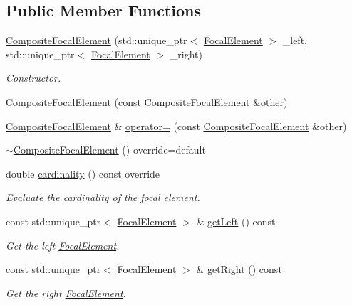 \subsection*{Public Member Functions}
\begin{DoxyCompactItemize}
\item 
\hyperlink{classCompositeFocalElement_a5edb45a7eb4e963f8a3fe9f5e86dbcc2}{Composite\+Focal\+Element} (std\+::unique\+\_\+ptr$<$ \hyperlink{classFocalElement}{Focal\+Element} $>$ \+\_\+left, std\+::unique\+\_\+ptr$<$ \hyperlink{classFocalElement}{Focal\+Element} $>$ \+\_\+right)
\begin{DoxyCompactList}\small\item\em Constructor. \end{DoxyCompactList}\item 
\hyperlink{classCompositeFocalElement_ad7bf43cd99f64e40b1db1d02dbb69713}{Composite\+Focal\+Element} (const \hyperlink{classCompositeFocalElement}{Composite\+Focal\+Element} \&other)
\item 
\hyperlink{classCompositeFocalElement}{Composite\+Focal\+Element} \& \hyperlink{classCompositeFocalElement_a08412d0e70bab10c523baa83b6eb1937}{operator=} (const \hyperlink{classCompositeFocalElement}{Composite\+Focal\+Element} \&other)
\item 
\hyperlink{classCompositeFocalElement_a29f321b81347d8d687aca284e0507aec}{$\sim$\+Composite\+Focal\+Element} () override=default
\item 
double \hyperlink{classCompositeFocalElement_a18a671ee1759b5df42770384ace275fd}{cardinality} () const override
\begin{DoxyCompactList}\small\item\em Evaluate the cardinality of the focal element. \end{DoxyCompactList}\item 
const std\+::unique\+\_\+ptr$<$ \hyperlink{classFocalElement}{Focal\+Element} $>$ \& \hyperlink{classCompositeFocalElement_af4e6a58bc9db40cde3446b76d91f5e57}{get\+Left} () const 
\begin{DoxyCompactList}\small\item\em Get the left \hyperlink{classFocalElement}{Focal\+Element}. \end{DoxyCompactList}\item 
const std\+::unique\+\_\+ptr$<$ \hyperlink{classFocalElement}{Focal\+Element} $>$ \& \hyperlink{classCompositeFocalElement_aef97b94d2375742722833674a3f38a54}{get\+Right} () const 
\begin{DoxyCompactList}\small\item\em Get the right \hyperlink{classFocalElement}{Focal\+Element}. \end{DoxyCompactList}\item 

\end{DoxyCompactItemize}

